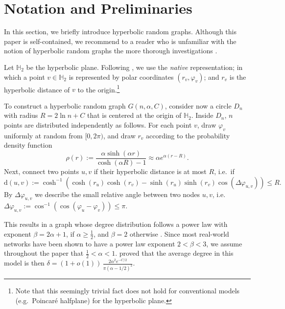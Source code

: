\documentclass{llncs}
\newcommand{\dist}{\mathrm{d}}
\renewcommand{\leq}{\leqslant}
\renewcommand{\geq}{\geqslant}
\begin{document}
\section{Notation and Preliminaries}
In this section, we briefly introduce hyperbolic random graphs. Although this paper is self-contained, we recommend to a reader who is unfamiliar with the notion of hyperbolic random graphs the more thorough investigations \cite{krioukov2010hyperbolic,gugelmann2012random}. 

Let $\mathbb H_2$ be the hyperbolic plane. Following \cite{krioukov2010hyperbolic}, we use the {\em native} representation; in which a point $v \in \mathbb H_2$ is represented by polar coordinates $(r_v, \varphi_v)$; and $r_v$ is the hyperbolic distance of $v$ to the origin.\footnote{Note that this seemingly trivial fact does not hold for conventional models (e.g.\ Poincar\'e halfplane) for the hyperbolic plane.}

To construct a hyperbolic random graph $G(n, \alpha, C)$, consider now a circle $D_n$ with radius $R = 2 \ln n + C$ that is centered at the origin of $\mathbb H_2$. Inside $D_n$, $n$ points are distributed independently as follows. For each point $v$, draw $\varphi_v$ uniformly at random from $[0,2\pi)$, and draw $r_v$ according to the probability density function
$$\rho(r) := \frac{\alpha \sinh(\alpha r)}{\cosh(\alpha R) - 1} \approx \alpha e^{\alpha(r-R)}.$$
Next, connect two points $u,v$ if their hyperbolic distance is at most $R$, i.e.\ if
\begin{equation}
\dist(u,v) := \cosh^{-1}(\cosh(r_u)\cosh(r_v) - \sinh(r_u)\sinh(r_v)\cos(\Delta\varphi_{u,v})) \leq R. \label{eq:distance}
\end{equation}
By $\Delta\varphi_{u,v}$ we describe the small relative angle between two nodes $u,v$, i.e. $\Delta\varphi_{u,v} := \cos^{-1}(\cos(\varphi_u - \varphi_v)) \leq \pi$. 

This results in a graph whose degree distribution follows a power law with exponent $\beta = 2\alpha+1$, if $\alpha \geq \tfrac12$, and $\beta = 2$ otherwise \cite{gugelmann2012random}. Since most real-world networks have been shown to have a power law exponent $2 < \beta < 3$, we assume throughout the paper that $\tfrac 12 < \alpha < 1$. \citet{gugelmann2012random} proved that the average degree in this model is then $\delta = (1+o(1))\,\frac{2 \alpha^2 e^{-C/2}}{\pi (\alpha-1/2)^2}$.
\end{document}
